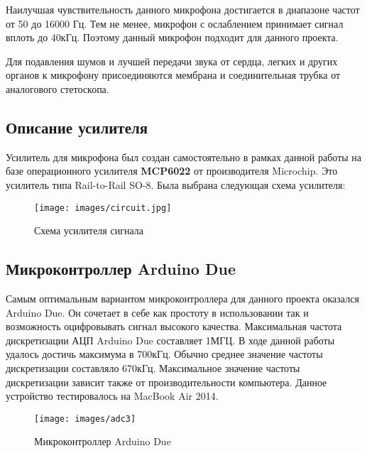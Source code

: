 \documentclass[../main.tex]{subfiles}
\begin{document}
Наилучшая чувствительность данного микрофона достигается в диапазоне частот от 50 до 16000 Гц. Тем не менее, микрофон с ослаблением принимает сигнал вплоть до 40кГц. Поэтому данный микрофон подходит для данного проекта.

Для подавления шумов и лучшей передачи звука от сердца, легких и других органов к микрофону присоединяются мембрана и соединительная трубка от аналогового стетоскопа.

\subsection{Описание усилителя}
Усилитель для микрофона был создан самостоятельно в рамках данной работы на базе операционного усилителя \textbf{MCP6022} от производителя Microchip. Это усилитель типа Rail-to-Rail SO-8. Была выбрана следующая схема усилителя:

\begin{figure}[H]
\centering
\texttt{[image: images/circuit.jpg]}
\caption{Схема усилителя сигнала}
\end{figure}

\subsection{Микроконтроллер Arduino Due}
Самым оптимальным вариантом микроконтроллера для данного проекта оказался Arduino Due. Он сочетает в себе как простоту в использовании так и возможность оцифровывать сигнал высокого качества. Максимальная частота дискретизации АЦП Arduino Due составляет 1МГЦ. В ходе данной работы удалось достичь максимума в 700кГц. Обычно среднее значение частоты дискретизации составляло 670кГц. Максимальное значение частоты дискретизации зависит также от производительности компьютера. Данное устройство тестировалось на MacBook Air 2014.

\begin{figure}[H]
\centering
\texttt{[image: images/adc3]}
\caption{Микроконтроллер Arduino Due}
\end{figure}
\end{document}
